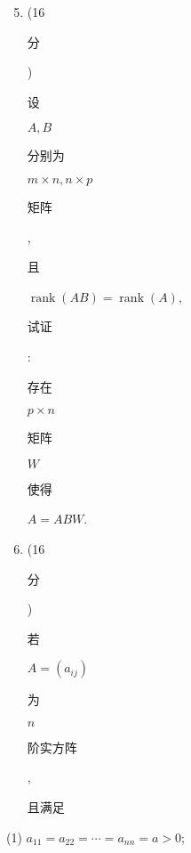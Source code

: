 \documentclass[10pt]{article}
\begin{document}
\begin{enumerate}
  \setcounter{enumi}{4}
  \item (16 \begin{CJK}{UTF8}{mj}分\end{CJK}) \begin{CJK}{UTF8}{mj}设\end{CJK} $A, B$ \begin{CJK}{UTF8}{mj}分别为\end{CJK} $m \times n, n \times p$ \begin{CJK}{UTF8}{mj}矩阵\end{CJK}, \begin{CJK}{UTF8}{mj}且\end{CJK} $\operatorname{rank}(A B)=\operatorname{rank}(A)$, \begin{CJK}{UTF8}{mj}试证\end{CJK}: \begin{CJK}{UTF8}{mj}存在\end{CJK} $p \times n$ \begin{CJK}{UTF8}{mj}矩阵\end{CJK} $W$ \begin{CJK}{UTF8}{mj}使得\end{CJK} $A=A B W$.

  \item (16 \begin{CJK}{UTF8}{mj}分\end{CJK}) \begin{CJK}{UTF8}{mj}若\end{CJK} $A=\left(a_{i j}\right)$ \begin{CJK}{UTF8}{mj}为\end{CJK} $n$ \begin{CJK}{UTF8}{mj}阶实方阵\end{CJK}, \begin{CJK}{UTF8}{mj}且满足\end{CJK}

\end{enumerate}
(1) $a_{11}=a_{22}=\cdots=a_{n n}=a>0$;
\end{document}
